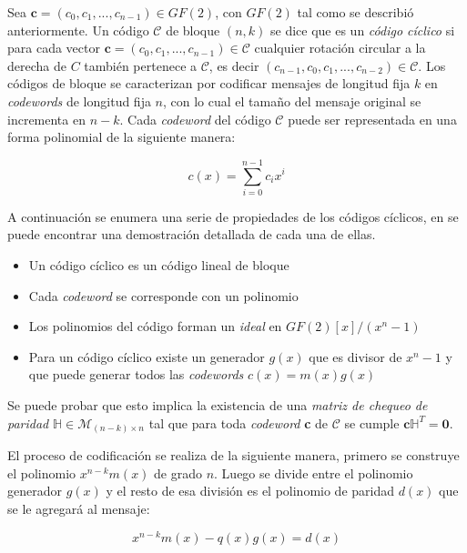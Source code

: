 Sea $\textbf{c} = (c_0, c_1, ..., c_{n-1}) \in GF(2)$, con $GF(2)$ tal como se describió anteriormente. Un código $\mathcal{C}$ de bloque $(n, k)$ se dice que es un \textit{código cíclico} si para cada vector $\textbf{c} = (c_0, c_1, ..., c_{n-1}) \in \mathcal{C}$ cualquier rotación circular a la derecha de $C$ también pertenece a $\mathcal{C}$, es decir $(c_{n-1}, c_0, c_1, ..., c_{n-2}) \in \mathcal{C}$.
Los códigos de bloque se caracterizan por codificar mensajes de longitud fija $k$ en \textit{codewords} de longitud fija $n$, con lo cual el tamaño del mensaje original se incrementa en $n-k$.
Cada \textit{codeword} del código $\mathcal{C}$ puede ser representada en una forma polinomial de la siguiente manera:

\begin{equation}
c(x) = \sum_{i = 0}^{n-1}c_i x^i
\end{equation}

A continuación se enumera una serie de propiedades de los códigos cíclicos, en \cite{moon2005error} se puede encontrar una demostración detallada de cada una de ellas.

\begin{itemize}
\item{Un código cíclico es un código lineal de bloque}
\item{Cada \textit{codeword} se corresponde con un polinomio}
\item{Los polinomios del código forman un \textit{ideal} en $GF(2)[x]/(x^n-1)$}
\item{Para un código cíclico existe un generador $g(x)$ que es divisor de $x^n-1$ y que puede generar todos las \textit{codewords} $c(x)=m(x)g(x)$}
\end{itemize}

Se puede probar que esto implica la existencia de una \textit{matriz de chequeo de paridad} $\mathbb{H} \in \mathcal{M}_{(n-k)\times n}$ tal que para toda \textit{codeword} \textbf{c} de $\mathcal{C}$ se cumple $\textbf{c} \mathbb{H} ^T = \textbf{0}$.


El proceso de codificación se realiza de la siguiente manera, primero se construye el polinomio $x^{n-k}m(x)$ de grado $n$. Luego se divide entre el polinomio generador $g(x)$ y el resto de esa división es el polinomio de paridad $d(x)$ que se le agregará al mensaje:

\begin{equation}
x^{n-k}m(x) - q(x)g(x) = d(x)
\end{equation}

